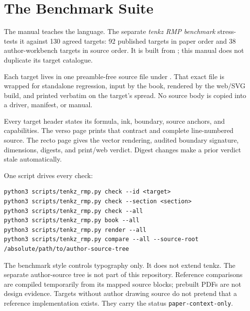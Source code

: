 \section{The Benchmark Suite}\label{ch:rmp}

The manual teaches the language.  The separate \emph{tenkz RMP benchmark}
stress-tests it against 130 agreed targets: 92 published targets in paper
order and 38 author-workbench targets in source order.  It is built from
; this manual does not duplicate its
target catalogue.

Each target lives in one preamble-free source file under
.  That exact file is wrapped for standalone
regression, input by the book, rendered by the web/SVG build, and printed
verbatim on the target's spread.  No source body is copied into a driver,
manifest, or manual.

Every target header states its formula, ink, boundary, source anchors, and
capabilities.  The verso page prints that contract and complete line-numbered
source.  The recto page gives the vector rendering, audited boundary
signature, dimensions, digests, and print/web verdict.  Digest changes make a
prior verdict stale automatically.

One script drives every check:

\begin{Verbatim}[fontsize=\footnotesize,frame=leftline]
python3 scripts/tenkz_rmp.py check --id <target>
python3 scripts/tenkz_rmp.py check --section <section>
python3 scripts/tenkz_rmp.py check --all
python3 scripts/tenkz_rmp.py book --all
python3 scripts/tenkz_rmp.py render --all
python3 scripts/tenkz_rmp.py compare --all --source-root /absolute/path/to/author-source-tree
\end{Verbatim}

The benchmark style controls typography only.  It does not extend tenkz.
The separate author-source tree is not part of this repository.  Reference
comparisons are compiled temporarily from its mapped source blocks; prebuilt
PDFs are not design evidence.  Targets without author drawing source do not
pretend that a reference implementation exists.  They carry the status
\texttt{paper-context-}\allowbreak\texttt{only}.
